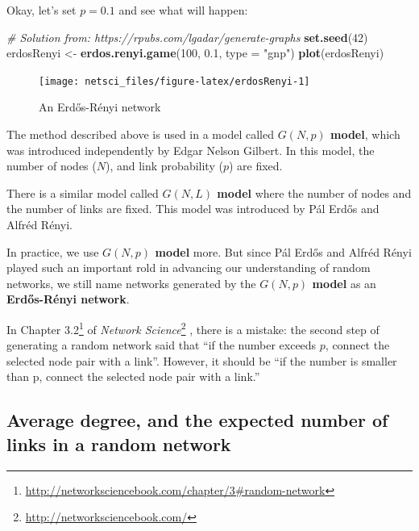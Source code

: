 \documentclass[
]{krantz}
\makeatletter
\newenvironment{Shaded}{\begin{snugshade}}{\end{snugshade}}
\newcommand{\CommentTok}[1]{\textcolor[rgb]{0.37,0.37,0.37}{\textit{#1}}}
\newcommand{\DataTypeTok}[1]{\textcolor[rgb]{0.27,0.27,0.27}{#1}}
\newcommand{\DecValTok}[1]{\textcolor[rgb]{0.06,0.06,0.06}{#1}}
\newcommand{\FloatTok}[1]{\textcolor[rgb]{0.06,0.06,0.06}{#1}}
\newcommand{\KeywordTok}[1]{\textcolor[rgb]{0.27,0.27,0.27}{\textbf{#1}}}
\newcommand{\NormalTok}[1]{#1}
\newcommand{\StringTok}[1]{\textcolor[rgb]{0.5,0.5,0.5}{#1}}
\renewcommand{\href}[2]{#2\footnote{\url{#1}}}
\newenvironment{kframe}{%
\medskip{}
\setlength{\fboxsep}{.8em}
 \def\at@end@of@kframe{}%
 \ifinner\ifhmode%
  \def\at@end@of@kframe{\end{minipage}}%
  \begin{minipage}{\columnwidth}%
 \fi\fi%
 \def\FrameCommand##1{\hskip\@totalleftmargin \hskip-\fboxsep
 \colorbox{shadecolor}{##1}\hskip-\fboxsep
     \hskip-\linewidth \hskip-\@totalleftmargin \hskip\columnwidth}%
 \MakeFramed {\advance\hsize-\width
   \@totalleftmargin\z@ \linewidth\hsize
   \@setminipage}}%
 {\par\unskip\endMakeFramed%
 \at@end@of@kframe}
\renewenvironment{Shaded}{\begin{kframe}}{\end{kframe}}
\newenvironment{rmdblock}[1]
  {
  \begin{itemize}
  \renewcommand{\labelitemi}{
    \raisebox{-.7\height}[0pt][0pt]{
      {\setkeys{Gin}{width=3em,keepaspectratio}\texttt{[image: images/\#1]}}
    }
  }
  \setlength{\fboxsep}{1em}
  \begin{kframe}
  \item
  }
  {
  \end{kframe}
  \end{itemize}
  }
\newenvironment{rmdcaution}
  {\begin{rmdblock}{caution}}
  {\end{rmdblock}}
\makeatother
\begin{document}
Okay, let's set \(p=0.1\) and see what will happen:

\begin{Shaded}
\begin{Highlighting}[]
\CommentTok{# Solution from: https://rpubs.com/lgadar/generate-graphs}
\KeywordTok{set.seed}\NormalTok{(}\DecValTok{42}\NormalTok{)}
\NormalTok{erdosRenyi <-}\StringTok{ }\KeywordTok{erdos.renyi.game}\NormalTok{(}\DecValTok{100}\NormalTok{, }\FloatTok{0.1}\NormalTok{, }\DataTypeTok{type =} \StringTok{"gnp"}\NormalTok{)}
\KeywordTok{plot}\NormalTok{(erdosRenyi)}
\end{Highlighting}
\end{Shaded}

\begin{figure}

{\centering \texttt{[image: netsci\_files/figure-latex/erdosRenyi-1]} 

}

\caption{An Erdős-Rényi network}\label{fig:erdosRenyi}
\end{figure}

The method described above is used in a model called \textbf{\(G(N,p)\) model}, which was introduced independently by Edgar Nelson Gilbert. In this model, the number of nodes (\(N\)), and link probability (\(p\)) are fixed.

There is a similar model called \textbf{\(G(N,L)\) model} where the number of nodes and the number of links are fixed. This model was introduced by Pál Erdős and Alfréd Rényi.

In practice, we use \textbf{\(G(N,p)\) model} more. But since Pál Erdős and Alfréd Rényi played such an important rold in advancing our understanding of random networks, we still name networks generated by the \textbf{\(G(N,p)\) model} as an \textbf{Erdős-Rényi network}.

\begin{rmdcaution}
In \href{http://networksciencebook.com/chapter/3\#random-network}{Chapter 3.2} of \href{http://networksciencebook.com/}{\emph{Network Science}} , there is a mistake: the second step of generating a random network said that ``if the number exceeds \(p\), connect the selected node pair with a link''. However, it should be ``if the number is smaller than p, connect the selected node pair with a link.''
\end{rmdcaution}

\hypertarget{average-degree-and-the-expected-number-of-links-in-a-random-network}{%
\subsection{Average degree, and the expected number of links in a random network}\label{average-degree-and-the-expected-number-of-links-in-a-random-network}}
\end{document}
